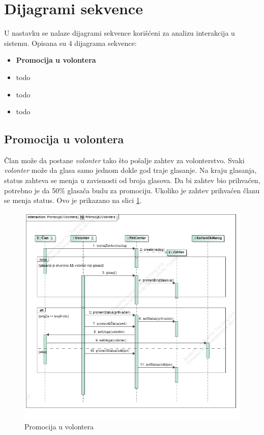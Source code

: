 \section{Dijagrami sekvence}
\par U nastavku se nalaze dijagrami sekvence korišćeni za analizu interakcija u sistemu. Opisana su 4 dijagrama sekvence:
\begin{itemize}
    \item \textbf{Promocija u volontera}
    \item todo
    \item todo
    \item todo
\end{itemize}
\subsection{Promocija u volontera}
\par Član može da postane \textit{volonter} tako što pošalje zahtev za volonterstvo. Svaki \textit{volonter} može da glasa samo jednom dokle god traje glasanje. 
Na kraju glasanja, status zahteva se menja u zavisnosti od broja glasova. Da bi zahtev bio prihvaćen,
potrebno je da 50\% glasača budu za promociju. Ukoliko je zahtev prihvaćen članu se menja status. Ovo je prikazano na slici \ref{fig:promotion-seq}.
\begin{figure}[h]
    \centering
    \includegraphics[width=\textwidth, height=0.9\textwidth]{img/promote-member-sequence.jpg}
    \caption{Promocija u volontera}
    \label{fig:promotion-seq}
\end{figure}